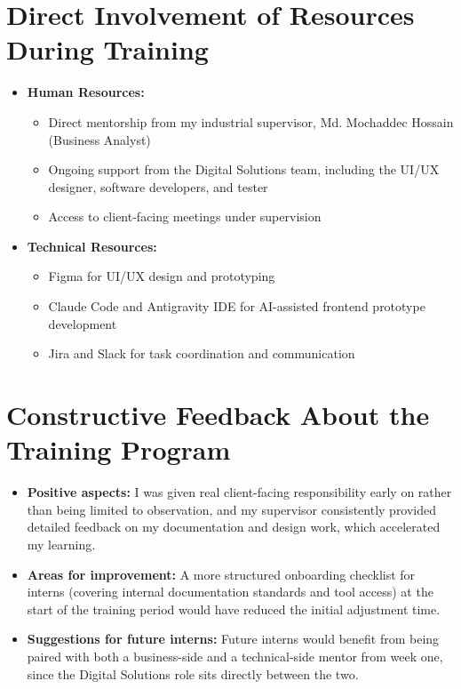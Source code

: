 \section{Direct Involvement of Resources During Training}
\begin{itemize}
    \item \textbf{Human Resources:}
    \begin{itemize}
        \item Direct mentorship from my industrial supervisor, Md. Mochaddec Hossain (Business Analyst)
        \item Ongoing support from the Digital Solutions team, including the UI/UX designer, software developers, and tester
        \item Access to client-facing meetings under supervision
    \end{itemize}
    \item \textbf{Technical Resources:}
    \begin{itemize}
        \item Figma for UI/UX design and prototyping
        \item Claude Code and Antigravity IDE for AI-assisted frontend prototype development
        \item Jira and Slack for task coordination and communication
    \end{itemize}
\end{itemize}


\section{Constructive Feedback About the Training Program}
\begin{itemize}
    \item \textbf{Positive aspects:} I was given real client-facing responsibility early on rather than being limited to observation, and my supervisor consistently provided detailed feedback on my documentation and design work, which accelerated my learning.
    \item \textbf{Areas for improvement:} A more structured onboarding checklist for interns (covering internal documentation standards and tool access) at the start of the training period would have reduced the initial adjustment time.
    \item \textbf{Suggestions for future interns:} Future interns would benefit from being paired with both a business-side and a technical-side mentor from week one, since the Digital Solutions role sits directly between the two.
\end{itemize}

